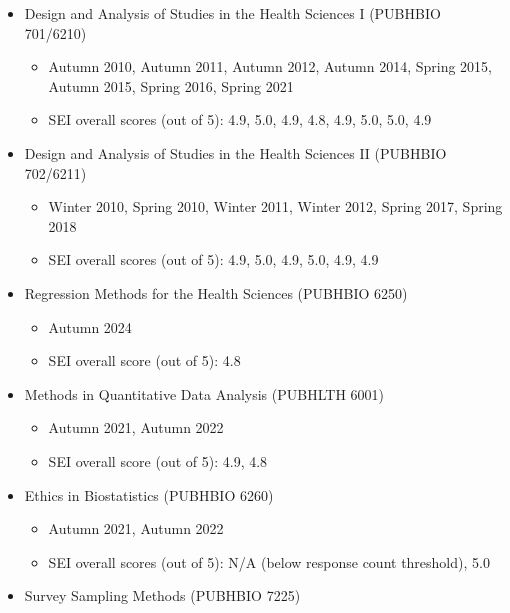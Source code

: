 \documentclass[
  english,
  letterpaper,
  DIV=11,
  numbers=noendperiod]{scrartcl}
\providecommand{\tightlist}{%
  \setlength{\itemsep}{0pt}\setlength{\parskip}{0pt}}
\begin{document}
\begin{itemize}
\tightlist
\item
  Design and Analysis of Studies in the Health Sciences I (PUBHBIO
  701/6210)

  \begin{itemize}
  \tightlist
  \item
    Autumn 2010, Autumn 2011, Autumn 2012, Autumn 2014, Spring 2015,
    Autumn 2015, Spring 2016, Spring 2021
  \item
    SEI overall scores (out of 5): 4.9, 5.0, 4.9, 4.8, 4.9, 5.0, 5.0,
    4.9
  \end{itemize}
\item
  Design and Analysis of Studies in the Health Sciences II (PUBHBIO
  702/6211)

  \begin{itemize}
  \tightlist
  \item
    Winter 2010, Spring 2010, Winter 2011, Winter 2012, Spring 2017,
    Spring 2018
  \item
    SEI overall scores (out of 5): 4.9, 5.0, 4.9, 5.0, 4.9, 4.9
  \end{itemize}
\item
  Regression Methods for the Health Sciences (PUBHBIO 6250)

  \begin{itemize}
  \tightlist
  \item
    Autumn 2024
  \item
    SEI overall score (out of 5): 4.8
  \end{itemize}
\item
  Methods in Quantitative Data Analysis (PUBHLTH 6001)

  \begin{itemize}
  \tightlist
  \item
    Autumn 2021, Autumn 2022
  \item
    SEI overall score (out of 5): 4.9, 4.8
  \end{itemize}
\item
  Ethics in Biostatistics (PUBHBIO 6260)

  \begin{itemize}
  \tightlist
  \item
    Autumn 2021, Autumn 2022
  \item
    SEI overall scores (out of 5): N/A (below response count threshold),
    5.0
  \end{itemize}
\item
  Survey Sampling Methods (PUBHBIO 7225)


\end{itemize}
\end{document}

